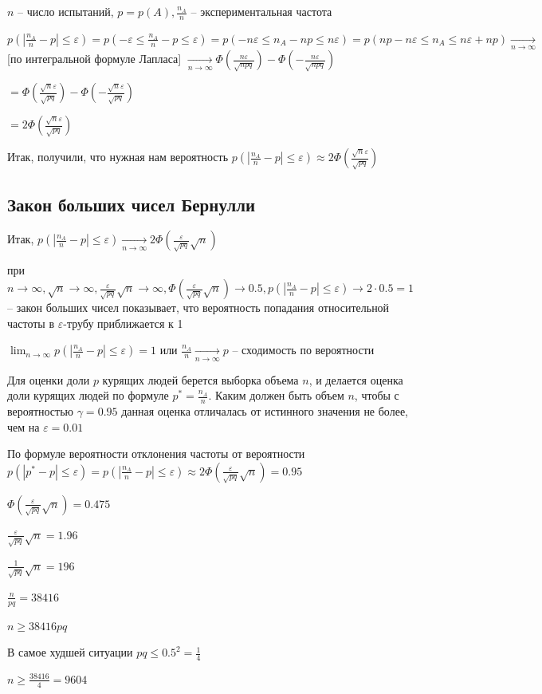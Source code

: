 \documentclass[12pt]{article}
\begin{document}
    $n$ -- число испытаний, $p = p(A), \frac{n_A}{n}$ -- экспериментальная частота

    $p\left(|\frac{n_A}{n} - p| \leq \varepsilon\right) = p\left(-\varepsilon \leq \frac{n_A}{n} - p \leq \varepsilon\right) = p(-n\varepsilon \leq n_A - np \leq n\varepsilon) = p(np - n\varepsilon \leq n_A \leq n\varepsilon + np) \underset{n \to \infty}{\longrightarrow}$ [по интегральной формуле Лапласа] $\underset{n \to \infty}{\longrightarrow} \Phi\left(\frac{n\varepsilon}{\sqrt{npq}}\right) - \Phi\left(-\frac{n\varepsilon}{\sqrt{npq}}\right)$

    $ = \Phi\left(\frac{\sqrt{n}\varepsilon}{\sqrt{pq}}\right) - \Phi\left(-\frac{\sqrt{n}\varepsilon}{\sqrt{pq}}\right)$

    $ = 2\Phi\left(\frac{\sqrt{n}\varepsilon}{\sqrt{pq}}\right)$

    Итак, получили, что нужная нам вероятность $p\left(|\frac{n_A}{n} - p| \leq \varepsilon\right) \approx 2\Phi\left(\frac{\sqrt{n}\varepsilon}{\sqrt{pq}}\right)$

    \hypertarget{lawofbignumbersbernoulli}{}

    \subsection{Закон больших чисел Бернулли}

    Итак, $p\left(|\frac{n_A}{n} - p| \leq \varepsilon\right) \underset{n \to \infty}{\longrightarrow} 2 \Phi\left(\frac{\varepsilon}{\sqrt{pq}}\sqrt{n}\right)$

    при $n \to \infty, \sqrt{n} \to \infty, \frac{\varepsilon}{\sqrt{pq}} \sqrt{n} \to \infty, \Phi\left(\frac{\varepsilon}{\sqrt{pq}}\sqrt{n}\right) \to 0.5, p\left(|\frac{n_A}{n} - p| \leq \varepsilon\right) \to 2 \cdot 0.5 = 1$ -- 
    закон больших чисел показывает, что вероятность попадания относительной частоты в $\varepsilon$-трубу приближается к 1

    $\lim_{n \to \infty} p\left(|\frac{n_A}{n} - p| \leq \varepsilon\right) = 1$ или $\frac{n_A}{n} \underset{n \to \infty}{\longrightarrow} p$ -- сходимость по вероятности

    \Ex Для оценки доли $p$ курящих людей берется выборка объема $n$, и делается оценка доли курящих людей по формуле $p^* = \frac{n_A}{n}$.
    Каким должен быть объем $n$, чтобы с вероятностью $\gamma = 0.95$ данная оценка отличалась от истинного значения не более, чем на $\varepsilon = 0.01$

    По формуле вероятности отклонения частоты от вероятности $p(|p^* - p| \leq \varepsilon) = p\left(|\frac{n_A}{n} - p| \leq \varepsilon\right) \approx 2\Phi\left(\frac{\varepsilon}{\sqrt{pq}}\sqrt{n}\right) = 0.95$

    $\Phi\left(\frac{\varepsilon}{\sqrt{pq}}\sqrt{n}\right) = 0.475$

    $\frac{\varepsilon}{\sqrt{pq}}\sqrt{n} = 1.96$

    $\frac{1}{\sqrt{pq}}\sqrt{n} = 196$

    $\frac{n}{pq} = 38416$

    $n \geq 38416 pq$

    В самое худшей ситуации $pq \leq 0.5^2 = \frac{1}{4}$

    $n \geq \frac{38416}{4} = 9604$
\end{document}

